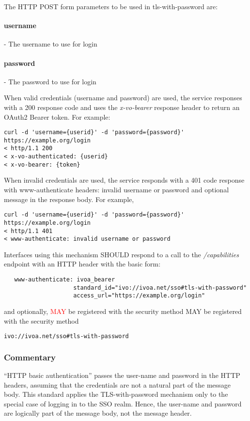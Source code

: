 \documentclass[11pt,a4paper]{ivoa}
\begin{document}
The HTTP POST form parameters to be used in tls-with-password are:
\paragraph{username} - The username to use for login
\paragraph{password} - The password to use for login

When valid credentials (username and password) are used, the service
responses with a 200 response code and uses the \emph{x-vo-bearer}
response header to return an OAuth2 Bearer token.  For example:

\begin{verbatim}
curl -d 'username={userid}' -d 'password={password}' https://example.org/login
< http/1.1 200
< x-vo-authenticated: {userid}
< x-vo-bearer: {token}
\end{verbatim}

When invalid credentials are used, the service responds with a 401 code
response with www-authenticate headers: invalid username or password  
and optional message in the response body. For example,

\begin{verbatim}
curl -d 'username={userid}' -d 'password={password}' https://example.org/login
< http/1.1 401 
< www-authenticate: invalid username or password
\end{verbatim}

Interfaces using this mechanism SHOULD respond to a call to the 
\emph{/capabilities} endpoint with an HTTP header with the basic form:
\begin{verbatim}
   www-authenticate: ivoa_bearer 
                    standard_id="ivo://ivoa.net/sso#tls-with-password"
                    access_url="https://example.org/login"
\end{verbatim}

and optionally, \textcolor{red}{MAY} be  registered with the security
method MAY be registered with the security
method

 \texttt{ivo://ivoa.net/sso\#tls-with-password}

\subsubsection{Commentary}
``HTTP basic authentication'' passes the user-name and password in the
HTTP headers,
assuming that the credentials are not a natural part of the message
body. This standard applies the TLS-with-password mechanism only to the
special case of logging in to the SSO realm.
Hence, the user-name and password are logically part of the message
body, not the message header.
\end{document}
